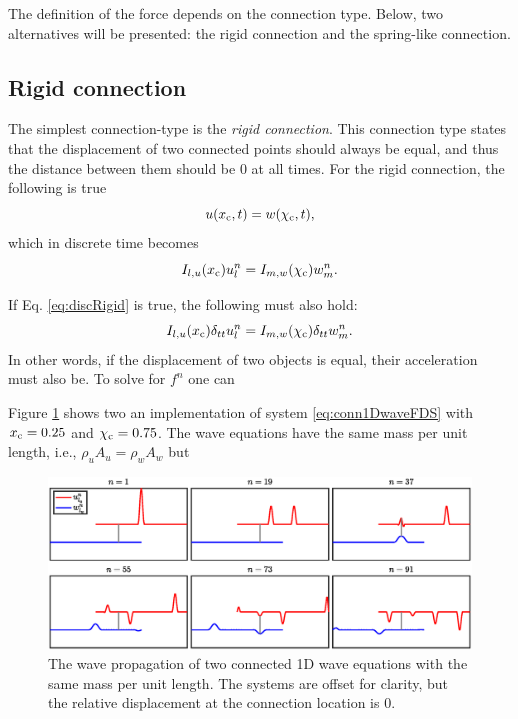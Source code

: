 The definition of the force depends on the connection type. Below, two alternatives will be presented: the rigid connection and the spring-like connection. 

\subsection{Rigid connection}
The simplest connection-type is the \textit{rigid connection}. This connection type states that the displacement of two connected points should always be equal, and thus the distance between them should be 0 at all times.
For the rigid connection, the following is true
\begin{equation}\label{eq:contRigid}
    u(x_{\text{c}}, t) = w(\chi_{\text{c}}, t),
\end{equation}
which in discrete time becomes
\begin{equation}\label{eq:discRigid}
    I_{l, u}(x_{\text{c}})u_l^n = I_{m, w}(\chi_{\text{c}})w_m^n.
\end{equation}

If Eq. \eqref{eq:discRigid} is true, the following must also hold:
\begin{equation}
    I_{l, u}(x_{\text{c}})\delta_{tt}u_l^n = I_{m, w}(\chi_{\text{c}})\delta_{tt}w_m^n.
\end{equation}
In other words, if the displacement of two objects is equal, their acceleration must also be. To solve for $f^n$ one can 


Figure \ref{fig:connectedWaveEqs} shows two an implementation of system \eqref{eq:conn1DwaveFDS} with $x_{\text{c}} = 0.25$ and $\chi_{\text{c}} = 0.75$. The wave equations have the same mass per unit length, i.e., $\rho_uA_u = \rho_wA_w$ but 
\begin{figure}
    \includegraphics[width=\textwidth]{figures/interactions/connectedWaveEqs.eps}
    \caption{The wave propagation of two connected 1D wave equations with the same mass per unit length. The systems are offset for clarity, but the relative displacement at the connection location is 0. \label{fig:connectedWaveEqs}}
\end{figure}


